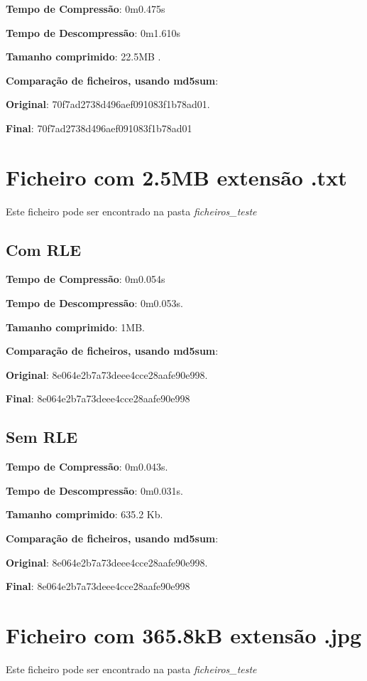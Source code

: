 \documentclass[11pt,a4paper]{report}
\begin{document}
\textbf{Tempo de Compressão}: 0m0.475s

\textbf{Tempo de Descompressão}: 	0m1.610s

\textbf{Tamanho comprimido}: 22.5MB .

\textbf{Comparação de ficheiros, usando md5sum}:

\textbf{Original}: 70f7ad2738d496aef091083f1b78ad01.

\textbf{Final}: 70f7ad2738d496aef091083f1b78ad01

\newpage

\section{Ficheiro com 2.5MB extensão .txt}

Este ficheiro pode ser encontrado na pasta \textit{ficheiros\_teste}

	\subsection{Com RLE}
	\textbf{Tempo de Compressão}: 0m0.054s

	\textbf{Tempo de Descompressão}: 0m0.053s.

	\textbf{Tamanho comprimido}: 1MB.

	\textbf{Comparação de ficheiros, usando md5sum}:

	\textbf{Original}: 8e064e2b7a73deee4cce28aafe90e998.

	\textbf{Final}: 8e064e2b7a73deee4cce28aafe90e998
	\subsection{Sem RLE}
	\textbf{Tempo de Compressão}: 0m0.043s.

	\textbf{Tempo de Descompressão}: 0m0.031s.

	\textbf{Tamanho comprimido}: 635.2 Kb.

	\textbf{Comparação de ficheiros, usando md5sum}:

	\textbf{Original}: 8e064e2b7a73deee4cce28aafe90e998.

	\textbf{Final}: 8e064e2b7a73deee4cce28aafe90e998


\section{Ficheiro com 365.8kB extensão .jpg}

Este ficheiro pode ser encontrado na pasta \textit{ficheiros\_teste}
\end{document}

